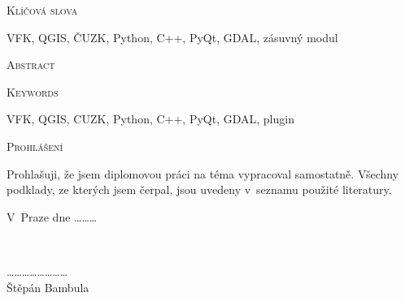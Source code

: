 \documentclass[12pt]{article}
\begin{document}
\vspace{32pt}

\noindent
\textsc{\Large Klíčová slova}

\vspace{12pt}

VFK, QGIS, ČUZK, Python, C++, PyQt, GDAL, zásuvný modul


\vfill

\noindent
\textsc{\Large Abstract}

\vspace{12pt}


\vspace{32pt}

\noindent
\textsc{\Large Keywords}

\vspace{12pt}
VFK, QGIS, CUZK, Python, C++, PyQt, GDAL, plugin


\vfill

\clearpage
\vspace*{\fill}

\noindent
\textsc{\Large Prohlášení}

\vspace{12pt}
Prohlašuji, že jsem diplomovou práci na téma  vypracoval samostatně. Všechny podklady, ze kterých jsem čerpal, jsou uvedeny v~seznamu použité literatury.

\vspace{24pt}
\noindent
\begin{minipage}{0.4\textwidth}
\begin{flushleft}
\center 
V~Praze dne \dots \dots \dots \\
\end{flushleft}
\end{minipage}
~
\begin{minipage}{0.8\textwidth}
\begin{flushright} 
\vspace{20pt}
\center
\dots \dots \dots \dots \dots \dots \dots \dots \\
Štěpán Bambula
\end{flushright}
\end{minipage}\\[2cm]


\clearpage
\vspace*{\fill}
\end{document}
